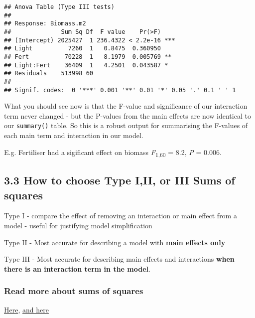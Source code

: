 \documentclass[
]{article}
\begin{document}
\begin{verbatim}
## Anova Table (Type III tests)
## 
## Response: Biomass.m2
##              Sum Sq Df  F value    Pr(>F)    
## (Intercept) 2025427  1 236.4322 < 2.2e-16 ***
## Light          7260  1   0.8475  0.360950    
## Fert          70228  1   8.1979  0.005769 ** 
## Light:Fert    36409  1   4.2501  0.043587 *  
## Residuals    513998 60                       
## ---
## Signif. codes:  0 '***' 0.001 '**' 0.01 '*' 0.05 '.' 0.1 ' ' 1
\end{verbatim}

What you should see now is that the F-value and significance of our
interaction term never changed - but the P-values from the main effects
are now identical to our \texttt{summary()} table. So this is a robust
output for summarising the F-values of each main term and interaction in
our model.

E.g. Fertiliser had a sigificant effect on biomass
\emph{F}\textsubscript{1,60} = 8.2, \emph{P} = 0.006.

\hypertarget{how-to-choose-type-iii-or-iii-sums-of-squares}{%
\subsection{3.3 How to choose Type I,II, or III Sums of
squares}\label{how-to-choose-type-iii-or-iii-sums-of-squares}}

Type I - compare the effect of removing an interaction or main effect
from a model - useful for justifying model simplification

Type II - Most accurate for describing a model with \textbf{main effects
only}

Type III - Most accurate for describing main effects and interactions
\textbf{when there is an interaction term in the model}.

\hypertarget{read-more-about-sums-of-squares}{%
\subsubsection{Read more about sums of
squares}\label{read-more-about-sums-of-squares}}

\href{https://mcfromnz.wordpress.com/2011/03/02/anova-type-iiiiii-ss-explained/}{Here},
\href{https://towardsdatascience.com/anovas-three-types-of-estimating-sums-of-squares-don-t-make-the-wrong-choice-91107c77a27a\#:~:text=Type\%20I\%20Sums\%20of\%20Squares\%2C\%20or\%20also\%20called\%20Sequential\%20Sums,of\%20variation\%20to\%20variable\%20A}{and
here}
\end{document}

